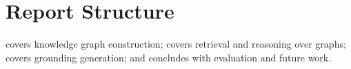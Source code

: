 \section{Report Structure}
\label{sec:gr-report-structure}


 covers knowledge graph construction;
 covers retrieval and reasoning over graphs;
 covers grounding generation; and
 concludes with evaluation and future work.
